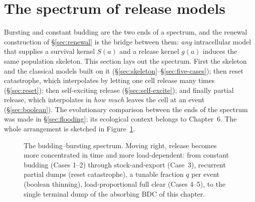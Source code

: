 
\section{The spectrum of release models}
\label{sec:spectrum}

Bursting and constant budding are the two ends of a spectrum, and the
renewal construction of \S\ref{sec:renewal} is the bridge between them:
\emph{any} intracellular model that supplies a survival kernel $S(a)$ and a
release kernel $g(a)$ induces the same population skeleton. This section
lays out the spectrum. First the skeleton and the classical models built on
it (\S\ref{sec:skeleton}--\S\ref{sec:five-cases}); then reset catastrophe,
which interpolates by letting one cell release many times
(\S\ref{sec:reset}); then self-exciting release (\S\ref{sec:self-excite});
and finally partial release, which interpolates in \emph{how much} leaves
the cell at an event (\S\ref{sec:boolean}). The evolutionary comparison
between the ends of the spectrum was made in \S\ref{sec:flooding}; its
ecological context belongs to Chapter~6. The whole arrangement is sketched
in Figure~\ref{fig:spectrum-map}.

\begin{figure}[H]
\centering
{}
\caption{The budding--bursting spectrum. Moving right, release becomes more
concentrated in time and more load-dependent: from constant budding (Cases
1--2) through stock-and-export (Case~3), recurrent partial dumps (reset
catastrophe), a tunable fraction $q$ per event (boolean thinning),
load-proportional full clear (Cases 4--5), to the single terminal dump of
the absorbing BDC of this chapter.}
\label{fig:spectrum-map}
\end{figure}

